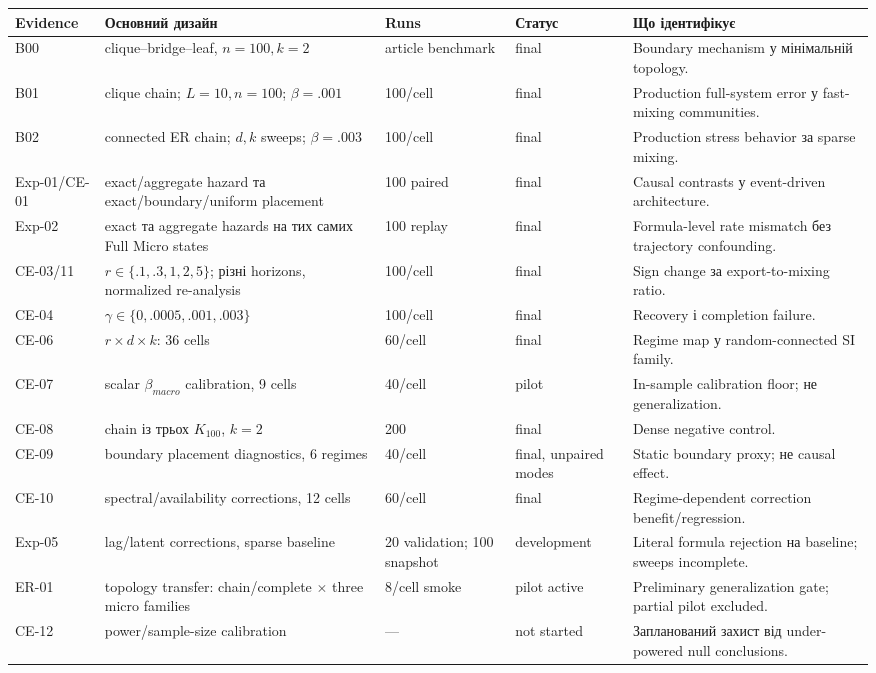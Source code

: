 \documentclass[11pt,a4paper]{article}
\begin{document}
\begin{longtable}{p{2.25cm}p{4.25cm}p{1.45cm}p{2.35cm}p{4.6cm}}
\toprule
Evidence & Основний дизайн & Runs & Статус & Що ідентифікує\\
\midrule
\endhead
B00 & clique--bridge--leaf, $n=100,k=2$ & article benchmark & final & Boundary mechanism у мінімальній topology.\\
B01 & clique chain; $L=10,n=100$; $\beta=.001$ & 100/cell & final & Production full-system error у fast-mixing communities.\\
B02 & connected ER chain; $d,k$ sweeps; $\beta=.003$ & 100/cell & final & Production stress behavior за sparse mixing.\\
Exp-01/CE-01 & exact/aggregate hazard та exact/boundary/uniform placement & 100 paired & final & Causal contrasts у event-driven architecture.\\
Exp-02 & exact та aggregate hazards на тих самих Full Micro states & 100 replay & final & Formula-level rate mismatch без trajectory confounding.\\
CE-03/11 & $r\in\{.1,.3,1,2,5\}$; різні horizons, normalized re-analysis & 100/cell & final & Sign change за export-to-mixing ratio.\\
CE-04 & $\gamma\in\{0,.0005,.001,.003\}$ & 100/cell & final & Recovery і completion failure.\\
CE-06 & $r\times d\times k$: 36 cells & 60/cell & final & Regime map у random-connected SI family.\\
CE-07 & scalar $\beta_{macro}$ calibration, 9 cells & 40/cell & pilot & In-sample calibration floor; не generalization.\\
CE-08 & chain із трьох $K_{100}$, $k=2$ & 200 & final & Dense negative control.\\
CE-09 & boundary placement diagnostics, 6 regimes & 40/cell & final, unpaired modes & Static boundary proxy; не causal effect.\\
CE-10 & spectral/availability corrections, 12 cells & 60/cell & final & Regime-dependent correction benefit/regression.\\
Exp-05 & lag/latent corrections, sparse baseline & 20 validation; 100 snapshot & development & Literal formula rejection на baseline; sweeps incomplete.\\
ER-01 & topology transfer: chain/complete $\times$ three micro families & 8/cell smoke & pilot active & Preliminary generalization gate; partial pilot excluded.\\
CE-12 & power/sample-size calibration & --- & not started & Запланований захист від under-powered null conclusions.\\
\bottomrule
\end{longtable}
\end{document}
